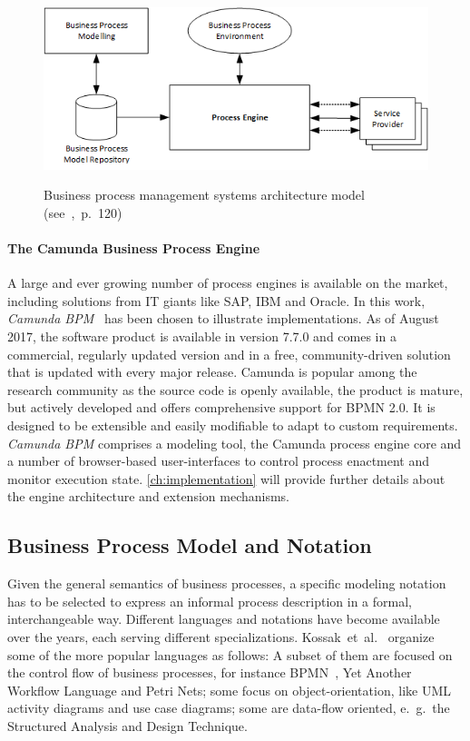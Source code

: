 \begin{figure}[]
	\myfloatalign
	{\includegraphics[width=1\linewidth]{chapters/background/bpm-architecture.png}}
	\caption{Business process management systems architecture model (see~\cite{weske:bpm-book},~p.~120)}
	\label{fig:bpm-architecture}
\end{figure}


\paragraph{The Camunda Business Process Engine}\label{ch:bg:camunda}
A large and ever growing number of process engines is available on the market, including solutions from IT giants like SAP, IBM and Oracle.
In this work, \emph{Camunda BPM}~\cite{camunda} has been chosen to illustrate implementations.
As of August 2017, the software product is available in version 7.7.0 and comes in a commercial, regularly updated version and in a free, community-driven solution that is updated with every major release.
Camunda is popular among the research community as the source code is openly available, the product is mature, but actively developed and offers comprehensive support for BPMN 2.0. It is designed to be extensible and easily modifiable to adapt to custom requirements.
\emph{Camunda BPM} comprises a modeling tool, the Camunda process engine core and a number of browser-based user-interfaces to control process enactment and monitor execution state.
\autoref{ch:implementation} will provide further details about the engine architecture and extension mechanisms.


\subsection{Business Process Model and Notation}
Given the general semantics of business processes, a specific modeling notation has to be selected to express an informal process description in a formal, interchangeable way.
Different languages and notations have become available over the years, each serving different specializations.
Kossak~et~al.~\cite{kossak:bpmn2} organize some of the more popular languages as follows: A subset of them are focused on the control flow of business processes, for instance \ac{BPMN}~\cite{bpmnspec}, Yet Another Workflow Language and Petri Nets; some focus on object-orientation, like \ac{UML} activity diagrams and use case diagrams; some are data-flow oriented, e.~g.~the Structured Analysis and Design Technique.

